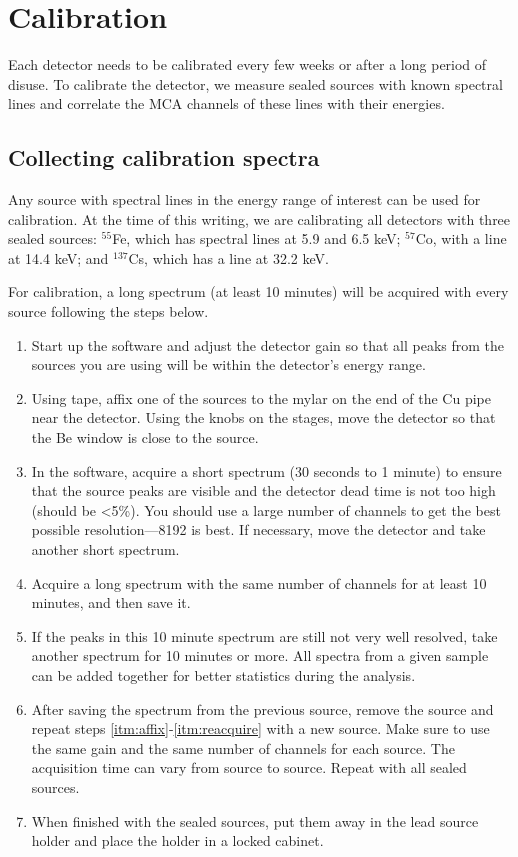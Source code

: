 \section{Calibration\label{sec:calib}}

Each detector needs to be calibrated every few weeks or after a long period of
disuse. To calibrate the detector, we measure sealed sources with known spectral
lines and correlate the MCA channels of these lines with their energies.

\subsection{Collecting calibration spectra}

Any source with spectral lines in the energy range of interest can be
used for calibration. At the time of this writing, we are calibrating
all detectors with three sealed sources: $^{55}$Fe, which has spectral
lines at 5.9 and 6.5 keV; $^{57}$Co, with a line at 14.4 keV; and
$^{137}$Cs, which has a line at 32.2 keV.

For calibration, a long spectrum (at least 10 minutes) will be
acquired with every source following the steps below.
\begin{enumerate}
\item Start up the software and adjust the detector gain so that all
  peaks from the sources you are using will be within the detector's
  energy range.
\item \label{itm:affix} Using tape, affix one of the sources to the
  mylar on the end of the Cu pipe near the detector. Using the knobs
  on the stages, move the detector so that the Be window is close to
  the source.
\item In the software, acquire a short spectrum (30 seconds to 1 minute) to
  ensure that the source peaks are visible and the detector dead time is not too
  high (should be <5\%). You should use a large number of channels to get the
  best possible resolution---8192 is best. If necessary, move the detector and
  take another short spectrum.
\item \label{itm:acquire} Acquire a long spectrum with the same number of
  channels for at least 10 minutes, and then save it.
\item \label{itm:reacquire} If the peaks in this 10 minute spectrum
  are still not very well resolved, take another spectrum for 10
  minutes or more. All spectra from a given sample can be added
  together for better statistics during the analysis.
\item After saving the spectrum from the previous source, remove the
  source and repeat steps \ref{itm:affix}-\ref{itm:reacquire} with a new
  source. Make sure to use the same gain and the same number of
  channels for each source. The acquisition time can vary from source
  to source. Repeat with all sealed sources.
\item When finished with the sealed sources, put them away in the lead
  source holder and place the holder in a locked cabinet.
\end{enumerate}
  
